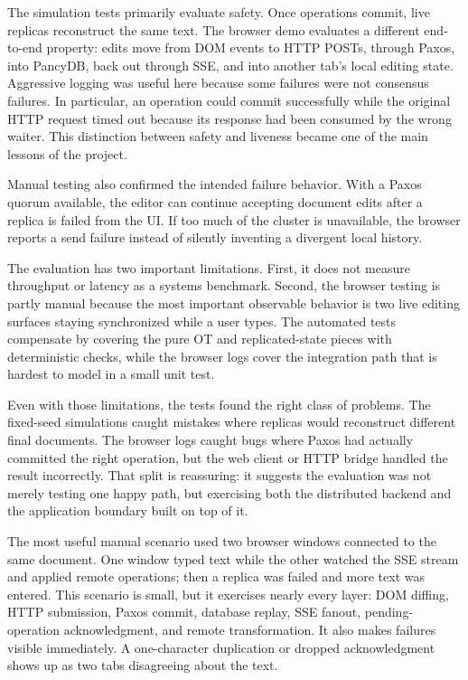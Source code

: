 \documentclass[11pt]{article}
\begin{document}
The simulation tests primarily evaluate safety. Once operations commit, live replicas reconstruct the same text. The browser demo evaluates a different end-to-end property: edits move from DOM events to HTTP POSTs, through Paxos, into PancyDB, back out through SSE, and into another tab's local editing state. Aggressive logging was useful here because some failures were not consensus failures. In particular, an operation could commit successfully while the original HTTP request timed out because its response had been consumed by the wrong waiter. This distinction between safety and liveness became one of the main lessons of the project.

Manual testing also confirmed the intended failure behavior. With a Paxos quorum available, the editor can continue accepting document edits after a replica is failed from the UI. If too much of the cluster is unavailable, the browser reports a send failure instead of silently inventing a divergent local history.

The evaluation has two important limitations. First, it does not measure throughput or latency as a systems benchmark. Second, the browser testing is partly manual because the most important observable behavior is two live editing surfaces staying synchronized while a user types. The automated tests compensate by covering the pure OT and replicated-state pieces with deterministic checks, while the browser logs cover the integration path that is hardest to model in a small unit test.

Even with those limitations, the tests found the right class of problems. The fixed-seed simulations caught mistakes where replicas would reconstruct different final documents. The browser logs caught bugs where Paxos had actually committed the right operation, but the web client or HTTP bridge handled the result incorrectly. That split is reassuring: it suggests the evaluation was not merely testing one happy path, but exercising both the distributed backend and the application boundary built on top of it.

The most useful manual scenario used two browser windows connected to the same document. One window typed text while the other watched the SSE stream and applied remote operations; then a replica was failed and more text was entered. This scenario is small, but it exercises nearly every layer: DOM diffing, HTTP submission, Paxos commit, database replay, SSE fanout, pending-operation acknowledgment, and remote transformation. It also makes failures visible immediately. A one-character duplication or dropped acknowledgment shows up as two tabs disagreeing about the text.
\end{document}
